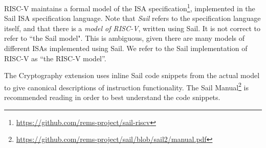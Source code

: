 
RISC-V maintains a formal model of the ISA specification\footnote{\url{https://github.com/rems-project/sail-riscv}}, implemented
in the Sail ISA specification language\cite{sail}.
Note that {\em Sail} refers to the specification language itself,
and that there is a {\em model of RISC-V}, written using Sail.
It is not correct to refer to ``the Sail model".
This is ambiguous, given there are many models of different ISAs implemented
using Sail. We refer to the Sail implementation of RISC-V as
``the RISC-V model''.

The Cryptography extension uses inline Sail code snippets from the
actual model to give canonical descriptions of instruction
functionality.
The Sail Manual\footnote{\url{https://github.com/rems-project/sail/blob/sail2/manual.pdf}} is recommended reading in order to
best understand the code snippets.
